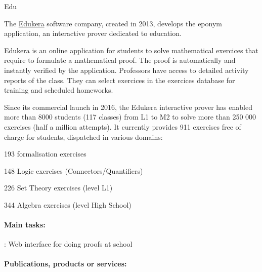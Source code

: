 \begin{sitedescription}{Edu}



The \hyperlink{https://www.edukera.com}{Edukera} software company, created in 2013,
develops the eponym application, an interactive prover dedicated to education.

Edukera is an online application for students to solve mathematical exercices that require to
formulate a mathematical proof. The proof is automatically and instantly verified by the application. Professors
have access to detailed activity reports of the class. They can select exercices in the exercices database
for training and scheduled homeworks.

Since its commercial launch in 2016, the Edukera interactive prover has enabled more than 8000 students
(117 classes) from L1 to M2 to solve more than 250 000 exercises (half a million attempts). It currently
provides 911 exercises free of charge for students, dispatched in various domains:
\begin{compactitem}
\item 193 formalisation exercises
\item 148 Logic exercises (Connectors/Quantifiers)
\item 226 Set Theory exercises (level L1)
\item 344 Algebra exercises (level High School)
\end{compactitem}

\paragraph*{Main tasks:}


\begin{compactitem}
\item {} : Web interface for doing proofs at school
\end{compactitem}

\paragraph*{Publications, products or services:}



\end{sitedescription}
